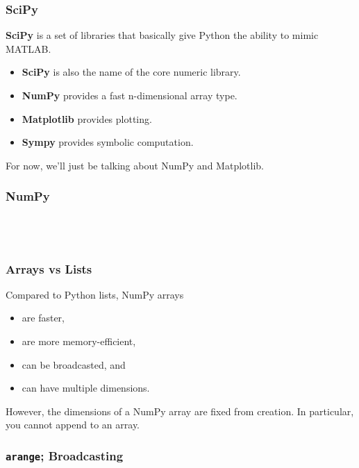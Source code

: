 \documentclass{beamer}
\begin{document}
\begin{frame}
  \frametitle{SciPy}
  \textbf{SciPy} is a set of libraries that basically give Python the ability to mimic MATLAB.
  \begin{itemize}
    \pause
  \item \textbf{SciPy} is also the name of the core numeric library.
    \pause
  \item \textbf{NumPy} provides a fast n-dimensional array type.
    \pause
  \item \textbf{Matplotlib} provides plotting.
    \pause
  \item \textbf{Sympy} provides symbolic computation.
  \end{itemize}
  \pause
  For now, we'll just be talking about NumPy and Matplotlib.
\end{frame}

\begin{frame}[fragile]
  \frametitle{NumPy}
  \inputminted[firstline=1,lastline=3]{pycon}{code/numpy.txt}
  \codepause
  \inputminted[firstline=4,lastline=5]{pycon}{code/numpy.txt}
  \codepause
  \inputminted[firstline=6,lastline=7]{pycon}{code/numpy.txt}
  \codepause
  \inputminted[firstline=8,lastline=9]{pycon}{code/numpy.txt}
\end{frame}

\begin{frame}
  \frametitle{Arrays vs Lists}
  Compared to Python lists, NumPy arrays
  \begin{itemize}
    \pause
  \item are faster,
    \pause
  \item are more memory-efficient,
    \pause
  \item can be broadcasted, and
    \pause
  \item can have multiple dimensions.
  \end{itemize}
  \pause
  However, the dimensions of a NumPy array are fixed from creation. In particular, you cannot append to an array.
\end{frame}

\begin{frame}[fragile]
  \frametitle{\texttt{arange}; Broadcasting}
  \inputminted[firstline=1,lastline=2]{pycon}{code/arange.txt}
  \codepause
  \inputminted[firstline=3,lastline=4]{pycon}{code/arange.txt}
  \codepause
  \inputminted[firstline=5,lastline=6]{pycon}{code/arange.txt}
  \codepause
  \inputminted[firstline=7,lastline=7]{pycon}{code/arange.txt}
  \codepause
  \inputminted[firstline=8,lastline=8]{pycon}{code/arange.txt}
  \codepause
  \inputminted[firstline=9,lastline=11]{pycon}{code/arange.txt}
\end{frame}
\end{document}
